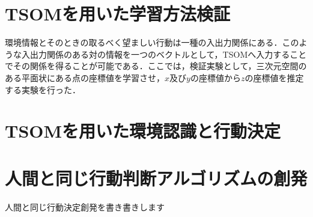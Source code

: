 %
\clearpage
\section{TSOMを用いた学習方法検証}
環境情報とそのときの取るべく望ましい行動は一種の入出力関係にある．このような入出力関係のある対の情報を一つのベクトルとして，TSOMへ入力することでその関係を得ることが可能である．ここでは，検証実験として，三次元空間のある平面状にある点の座標値を学習させ，$x$及び$y$の座標値から$z$の座標値を推定する実験を行った．
%
\clearpage
\section{TSOMを用いた環境認識と行動決定}

%
\clearpage
\section{人間と同じ行動判断アルゴリズムの創発}

人間と同じ行動決定創発を書き書きします

